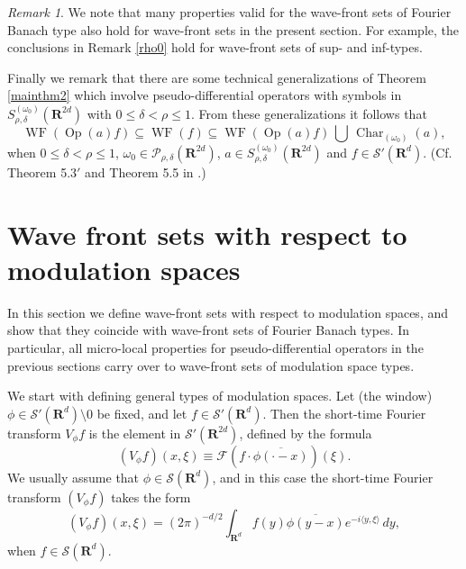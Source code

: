 \documentclass[12pt,a4paper,reqno]{amsart}
\numberwithin{equation}{section}
\numberwithin{thm}{section}
\theoremstyle{definition}
\theoremstyle{remark}
\newtheorem{rem}[thm]{Remark}
\begin{document}
\par

\begin{rem}\label{remhormWFsets}
We note that many properties valid for the wave-front sets of Fourier
Banach type also hold for wave-front sets in the present
section. For example, the conclusions in Remark \ref{rho0}
hold for wave-front sets of sup- and inf-types.
\end{rem}

\par

Finally we remark that there are some technical generalizations of
Theorem \ref{mainthm2} which involve pseudo-differential operators
with symbols in $S^{(\omega _0)}_{\rho ,\delta} ({\mathbf R^{{2d}}})$ with $0\le
\delta <\rho \le 1$. From these generalizations it follows that
$$
{\operatorname{WF}} ({\operatorname{Op}} (a)f) \subseteq {\operatorname{WF}}(f) \subseteq {\operatorname{WF}} ({\operatorname{Op}} (a)f){{\textstyle{\, \bigcup \, }}} {\operatorname{Char}}
_{(\omega _0)}(a),
$$
when $0\le \delta <\rho \le 1$, $\omega _0\in \mathscr P_{\rho ,\delta
}({\mathbf R^{{2d}}})$, $a\in S^{(\omega _0)}_{\rho ,\delta}({\mathbf R^{{2d}}})$ and
$f\in \mathscr S'({\mathbf R^{d}})$. (Cf. Theorem 5.3$'$ and Theorem 5.5 in
\cite{PTT1}.)

\par

\section{Wave front sets with respect to modulation spaces}\label{sec6}

\par

In this section we define wave-front sets with respect to modulation
spaces, and show that they coincide with wave-front sets of Fourier
Banach types. In particular, all micro-local properties for
pseudo-differential operators in the previous sections carry over to
wave-front sets of modulation space types.

\par

We start with defining general types of modulation spaces. Let
(the window) $\phi \in \mathscr S'({\mathbf R^{d}}){\setminus 0}$ be
fixed, and let $f\in \mathscr S'({\mathbf R^{d}})$. Then the short-time Fourier
transform $V_\phi f$ is the element in $\mathscr S'({\mathbf R^{{2d}}})$,
defined by the formula
$$ 
(V_{\phi} f)(x,\xi) \equiv \mathscr{F}(f\cdot
\overline{\phi(\cdot-x)})(\xi).
$$
We usually assume that $\phi \in \mathscr{S}({\mathbf R^{{d}}})$, and in
this case the short-time Fourier transform $(V_{\phi}f)$ takes
the form 
$$ 
(V_{\phi} f)(x,\xi)
=
(2\pi)^{-d/2}\int_{{\mathbf R^{{d}}}} f(y)\overline{\phi(y-x)}e^{-i{\langle y,\xi\rangle}
}\, dy,
$$ 
when $f\in \mathscr{S}({\mathbf R^{{d}}})$.
\end{document}
